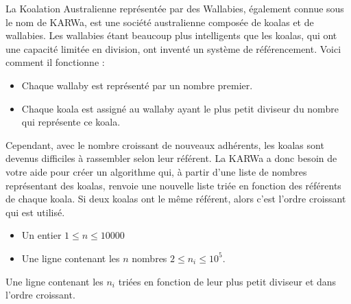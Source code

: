 \problemname{\problemyamlname}

La Koalation Australienne représentée par des Wallabies, également connue sous le nom de KARWa, est une société australienne composée de koalas et de wallabies. Les wallabies étant beaucoup plus intelligents que les koalas, qui ont une capacité limitée en division, ont inventé un système de référencement. Voici comment il fonctionne :

\begin{itemize}
	\item Chaque wallaby est représenté par un nombre premier.
	\item Chaque koala est assigné au wallaby ayant le plus petit diviseur du nombre qui représente ce koala.
\end{itemize}
Cependant, avec le nombre croissant de nouveaux adhérents, les koalas sont devenus difficiles à rassembler selon leur référent. La KARWa a donc besoin de votre aide pour créer un algorithme qui, à partir d'une liste de nombres représentant des koalas, renvoie une nouvelle liste triée en fonction des référents de chaque koala. Si deux koalas ont le même référent, alors c'est l'ordre croissant qui est utilisé.

\begin{Input}
	\begin{itemize}
		\item Un entier $1 \leq n \leq 10 000$
		\item Une ligne contenant les $n$ nombres $2 \leq n_i \leq 10^5$.
	\end{itemize}
\end{Input}

\begin{Output}
	Une ligne contenant les $n_i$ triées en fonction de leur plus petit diviseur et dans l'ordre croissant.
\end{Output}
